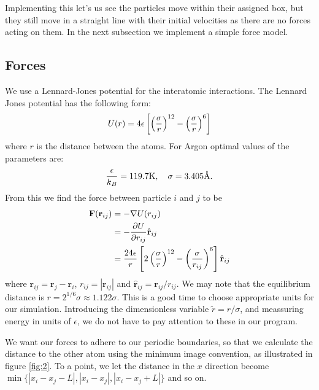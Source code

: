 \documentclass[12pt]{article}
\def\rvec{\textbf{r}}
\def\Fvec{\textbf{F}}
\begin{document}
Implementing this let's us see the particles move within their assigned box, but they still move in a straight line with their initial velocities as there are no forces acting on them. In the next subsection we implement a simple force model.

\subsection{Forces}
We use a Lennard-Jones potential for the interatomic interactions. The Lennard Jones potential has the following form:
\begin{equation}
 U(r) = 4\epsilon\left[ \left({\sigma \over r}\right)^{12} - \left({\sigma \over r}\right)^6 \right]
\end{equation}
where $r$ is the distance between the atoms. For Argon optimal values of the parameters are: 
\begin{equation}
 {\epsilon \over k_B} = 119.7 {\rm K}, \quad \sigma = 3.405 {\text{\AA .}}
\end{equation}
From this we find the force between particle $i$ and $j$ to be
\begin{align}
 \Fvec(\rvec_{ij}) & = -\nabla U(r_{ij}) \\
 & = -{\partial U \over \partial r_{ij}} \hat{\rvec}_{ij} \\
 & = {24\epsilon \over r} \left[ 2\left( {\sigma \over r} \right)^{12} - \left( {\sigma \over r_{ij}} \right)^{6} \right]\hat{\rvec}_{ij}
\end{align}
where $\rvec_{ij} = \rvec_j - \rvec_i$, $r_{ij} = |\rvec_{ij}|$ and $\hat{\rvec}_{ij} = \rvec_{ij}/r_{ij}$. We may note that the equilibrium distance is $r = 2^{1/6}\sigma \approx 1.122\sigma$. This is a good time to choose appropriate units for our simulation. Introducing the dimensionless variable $\tilde{r} = r/\sigma$, and meassuring energy in units of $\epsilon$, we do not have to pay attention to these in our program.

We want our forces to adhere to our periodic boundaries, so that we calculate the distance to the other atom using the minimum image convention, as illustrated in figure \ref{fig:2}. To a point, we let the distance in the $x$ direction become $\min \{ |x_i - x_j - L|, |x_i - x_j|, |x_i - x_j + L| \}$ and so on. 
\end{document}
